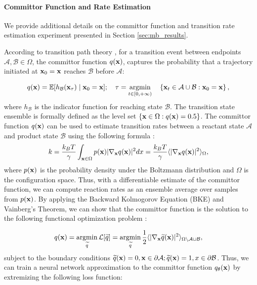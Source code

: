 \paragraph{Committor Function and Rate Estimation}
We provide additional details on the committor function and transition rate estimation experiment presented in Section \ref{sec:mb_results}. 

According to transition path theory \cite{vanden2006towards}, for a transition event between endpoints $\mathcal{A}, \mathcal{B} \in \Omega$, the committor function $q(\mathbf{x})$, captures the probability that a trajectory initiated at $\mathbf{x}_0 = \mathbf{x}$ reaches $\mathcal{B}$ before $\mathcal{A}$:

\begin{equation}
\label{eq:committor_full}
q(\xx) = \mathbb{E}[h_\mathcal{B}(\xx_\tau) \mid \xx_0 = \xx]; \quad
\tau = \argmin_{\substack{t \in [0, +\infty)}} \quad  \left \{ \xx_t \in \mathcal{A} \cup \mathcal{B} :
\xx_0 = \xx \right \},
\end{equation}
where $h_\mathcal{B}$ is the indicator function for reaching state $\mathcal{B}$. The transition state ensemble is formally defined as the level set $\{ \mathbf{x} \in \Omega: q(\mathbf{x}) = 0.5 \}$. The committor function $q(\mathbf{x})$ can be used to estimate transition rates between a reactant state $\mathcal{A}$ and product state $\mathcal{B}$ using the following formula \cite{vanden2006towards}:
\begin{equation}
    \label{eq:committor_rate_equiv}
    k = \frac{k_BT}{\gamma}\int_{\mathbf{x} \in \Omega} p(\mathbf{x}) |\nabla_{\mathbf{x}} q(\mathbf{x})|^2 dx = \frac{k_BT}{\gamma}\langle |\nabla_{\mathbf{x}} q(\mathbf{x})|^2 \rangle_\Omega,
\end{equation}
where $p(\mathbf{x})$ is the probability density under the Boltzmann distribution and $\Omega$ is the configuration space. Thus, with a differentiable estimate of the committor function, we can compute reaction rates as an ensemble average over samples from $p(\mathbf{x})$. By applying the Backward Kolmogorov Equation (BKE) and Vainberg’s Theorem, we can show that the committor function is the solution to the following functional optimization problem \cite{hasyim2022supervised}:

\begin{equation}
    \label{eq:func_opt}
    q(\xx) = \argmin_{\widetilde{q}} \mathcal{L}[\widetilde{q}] =  \argmin_{\widetilde{q}}\frac{1}{2} \langle |\nabla_\xx \widetilde{q}(\xx)|^2 \rangle_{\Omega \backslash \mathcal{A} \cup \mathcal{B}},
\end{equation}
subject to the boundary conditions $\widetilde{q}(\mathbf{x}) = 0, \mathbf{x} \in \partial \mathcal{A}; \widetilde{q}(\mathbf{x}) = 1, x \in \partial \mathcal{B}$. Thus, we can train a neural network approximation to the committor function $q_\theta(\mathbf{x})$ by extremizing the following loss function:

